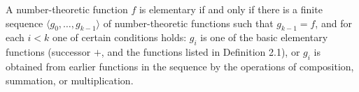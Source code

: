 A number-theoretic function $f$ is elementary if and only if there is a finite sequence $\langle g_0,\ldots,g_{k-1}\rangle$ of number-theoretic functions such that $g_{k-1}=f$, and for each $i<k$ one of certain conditions holds: $g_i$ is one of the basic elementary functions (successor $+$, and the functions listed in Definition 2.1), or $g_i$ is obtained from earlier functions in the sequence by the operations of composition, summation, or multiplication.
